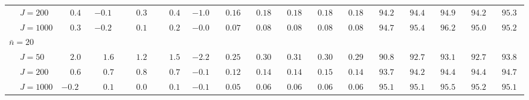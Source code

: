 \begin{sidewaystable}
\begin{threeparttable}
\begin{tabular}{llccccccccccccccc}
 & \nopagebreak $\;J=200$  & $\phantom{-}0.4\phantom{0}$ & ${-}0.1\phantom{0}$ & $\phantom{-}0.3\phantom{0}$ & $\phantom{-}0.4\phantom{0}$ & ${-}1.0\phantom{0}$ & $\phantom{0}0.16\phantom{0}$ & $\phantom{0}0.18\phantom{0}$ & $\phantom{0}0.18\phantom{0}$ & $\phantom{0}0.18\phantom{0}$ & $\phantom{0}0.18\phantom{0}$ & $\phantom{0}94.2\phantom{0}$ & $\phantom{0}94.4\phantom{0}$ & $\phantom{0}94.9\phantom{0}$ & $\phantom{0}94.2\phantom{0}$ & $\phantom{0}95.3\phantom{0}$ \\
 & \nopagebreak $\;J=1000$  & $\phantom{-}0.3\phantom{0}$ & ${-}0.2\phantom{0}$ & $\phantom{-}0.1\phantom{0}$ & $\phantom{-}0.2\phantom{0}$ & ${-}0.0\phantom{0}$ & $\phantom{0}0.07\phantom{0}$ & $\phantom{0}0.08\phantom{0}$ & $\phantom{0}0.08\phantom{0}$ & $\phantom{0}0.08\phantom{0}$ & $\phantom{0}0.08\phantom{0}$ & $\phantom{0}94.7\phantom{0}$ & $\phantom{0}95.4\phantom{0}$ & $\phantom{0}96.2\phantom{0}$ & $\phantom{0}95.0\phantom{0}$ & $\phantom{0}95.2\phantom{0}$ \\
\multicolumn{4}{l}{$\bar{n}=20$} \\  & \nopagebreak $\;J=50$  & $\phantom{-}2.0\phantom{0}$ & $\phantom{-}1.6\phantom{0}$ & $\phantom{-}1.2\phantom{0}$ & $\phantom{-}1.5\phantom{0}$ & ${-}2.2\phantom{0}$ & $\phantom{0}0.25\phantom{0}$ & $\phantom{0}0.30\phantom{0}$ & $\phantom{0}0.31\phantom{0}$ & $\phantom{0}0.30\phantom{0}$ & $\phantom{0}0.29\phantom{0}$ & $\phantom{0}90.8\phantom{0}$ & $\phantom{0}92.7\phantom{0}$ & $\phantom{0}93.1\phantom{0}$ & $\phantom{0}92.7\phantom{0}$ & $\phantom{0}93.8\phantom{0}$ \\
 & \nopagebreak $\;J=200$  & $\phantom{-}0.6\phantom{0}$ & $\phantom{-}0.7\phantom{0}$ & $\phantom{-}0.8\phantom{0}$ & $\phantom{-}0.7\phantom{0}$ & ${-}0.1\phantom{0}$ & $\phantom{0}0.12\phantom{0}$ & $\phantom{0}0.14\phantom{0}$ & $\phantom{0}0.14\phantom{0}$ & $\phantom{0}0.15\phantom{0}$ & $\phantom{0}0.14\phantom{0}$ & $\phantom{0}93.7\phantom{0}$ & $\phantom{0}94.2\phantom{0}$ & $\phantom{0}94.4\phantom{0}$ & $\phantom{0}94.4\phantom{0}$ & $\phantom{0}94.7\phantom{0}$ \\
 & \nopagebreak $\;J=1000$  & ${-}0.2\phantom{0}$ & $\phantom{-}0.1\phantom{0}$ & $\phantom{-}0.0\phantom{0}$ & $\phantom{-}0.1\phantom{0}$ & ${-}0.1\phantom{0}$ & $\phantom{0}0.05\phantom{0}$ & $\phantom{0}0.06\phantom{0}$ & $\phantom{0}0.06\phantom{0}$ & $\phantom{0}0.06\phantom{0}$ & $\phantom{0}0.06\phantom{0}$ & $\phantom{0}95.1\phantom{0}$ & $\phantom{0}95.1\phantom{0}$ & $\phantom{0}95.5\phantom{0}$ & $\phantom{0}95.2\phantom{0}$ & $\phantom{0}95.1\phantom{0}$ \\

\end{tabular}
\end{threeparttable}
\end{sidewaystable}
